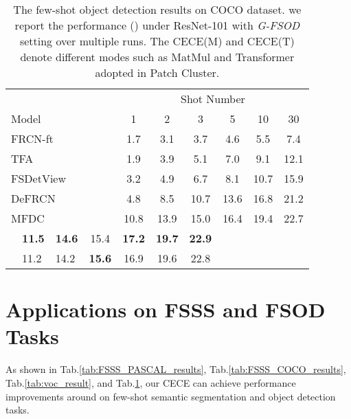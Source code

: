 \documentclass{article}
\begin{document}
\renewcommand{\tabcolsep}{1.5pt}
\begin{table}[t]
\vspace{-0.1cm}
\centering
\vspace{-0.1cm}
\resizebox{0.475\textwidth}{!}
{\begin{tabular}{l|l|l|c|cccccc}
\toprule[1.0pt]
\multicolumn{4}{l}{}  & \multicolumn{6}{c}{Shot Number} \\
\cmidrule(lr){5-10}
\multicolumn{4}{l|}{\multirow{-2}{*}{Model}} & 1        & 2              & 3             & 5             & 10    &30                \\ \midrule[0.9pt]
\multicolumn{4}{l|}{FRCN-ft \cite{yan2019meta}}          & 1.7         & 3.1  & 3.7          & 4.6          & 5.5          & 7.4                  \\
\multicolumn{4}{l|}{TFA \cite{wang2020frustratingly}}            & 1.9         & 3.9  & 5.1          & 7.0          & 9.1          & 12.1                 \\
\multicolumn{4}{l|}{FSDetView \cite{Xiao2020FSDetView}}           & 3.2         & 4.9  & 6.7         & 8.1         & 10.7        & 15.9           \\
\multicolumn{4}{l|}{{DeFRCN} \cite{qiao2021defrcn}}   & 4.8 & 8.5 & 10.7 & {13.6} & {16.8} & {21.2}  \\
\multicolumn{4}{l|}{{MFDC} \cite{wu2022multi} } & {10.8} & {13.9} & {15.0} & {16.4} & {19.4} & {22.7}  \\
\midrule[0.9pt]
\rowcolor[HTML]{EFEFEF}
\multicolumn{4}{l|}{\textbf{MFDC+CECE(M)}} & \textbf{11.5} & \textbf{14.6} & {15.4} & \textbf{17.2} & \textbf{19.7} & \textbf{22.9}  \\
\rowcolor[HTML]{EFEFEF}
\multicolumn{4}{l|}{\textbf{MFDC+CECE(T)}} & {11.2} & {14.2} & \textbf{15.6} & {16.9} & {19.6} & {22.8}  \\
\bottomrule[1.0pt]
\end{tabular}}
\vspace{-0.2cm}
\caption{The few-shot object detection results on COCO dataset. we report the performance () under ResNet-101 with \textit{G-FSOD} setting over multiple runs.
The CECE(M) and CECE(T) denote different modes such as MatMul and Transformer adopted in Patch Cluster.}
\label{tab:coco_result}
\end{table}


\section{Applications on FSSS and FSOD Tasks}
As shown in Tab.\ref{tab:FSSS_PASCAL_results}, Tab.\ref{tab:FSSS_COCO_results}, Tab.\ref{tab:voc_result}, and Tab.\ref{tab:coco_result}, our CECE can achieve performance improvements around  on few-shot semantic segmentation and object detection tasks.
\end{document}
